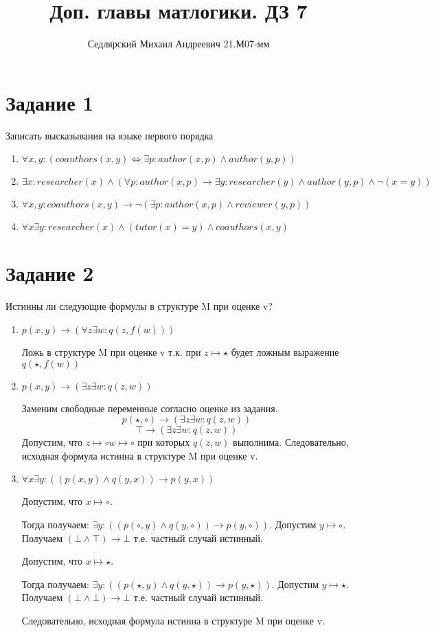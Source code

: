 \documentclass{article}
\title{Доп. главы матлогики. ДЗ 7}
\author{Седлярский Михаил Андреевич 21.М07-мм}
\date{ }
\begin{document}
\maketitle

\section*{Задание 1}
Записать высказывания на языке первого порядка
\begin{enumerate}
    \item 
        \(\forall x, y: (coauthors(x, y) \iff \exists p : author(x, p) \land author(y, p))\)
    \item 
        \(\exists x: researcher(x) \land (\forall p: author(x, p) \rightarrow \exists y : researcher(y) \land author(y, p) \land \neg(x = y))\)
    \item 
        \(\forall x, y: coauthors(x, y) \rightarrow \neg (\exists p: author(x, p) \land reviewer(y, p))\)
    \item 
        \(\forall x \exists y: researcher(x) \land (tutor(x) = y) \land coauthors(x, y)\)
\end{enumerate}

\section*{Задание 2}
Истинны ли следующие формулы в структуре M при оценке v?
\begin{enumerate}
    \item 
        \( p(x,y) \rightarrow (\forall z \exists w : q(z, f(w))) \)

        Ложь в структуре M при оценке v т.к. при \(z \mapsto \star\) будет ложным выражение \(q(\star, f(w))\)
    \item 
        \( p(x,y) \rightarrow (\exists z \exists w : q(z, w)) \)

        Заменим свободные переменные согласно оценке из задания.
        \[ p(\star,\circ) \rightarrow (\exists z \exists w : q(z, w)) \]
        \[ \top \rightarrow (\exists z \exists w : q(z, w)) \]
        Допустим, что \(z \mapsto \circ w \mapsto \circ\) при которых \(q(z, w)\) выполнима.
        Следовательно, исходная формула истинна в структуре M при оценке v.
    \item 
        \(\forall x \exists y : ((p(x,y) \land q(y,x)) \rightarrow p(y,x))\)

        Допустим, что \(x \mapsto \circ\). 

        Тогда получаем: \(\exists y : ((p(\circ,y) \land q(y,\circ)) \rightarrow p(y,\circ))\).
        Допустим \(y \mapsto \circ\). Получаем \((\bot \land \top) \rightarrow \bot\) т.е. частный случай истинный.
        
        Допустим, что \(x \mapsto \star\). 

        Тогда получаем: \(\exists y : ((p(\star,y) \land q(y,\star)) \rightarrow p(y,\star))\).
        Допустим \(y \mapsto \star\). Получаем \((\bot \land \bot) \rightarrow \bot\) т.е. частный случай истинный.

        Следовательно, исходная формула истинна в структуре M при оценке v.
\end{enumerate}
\end{document}
